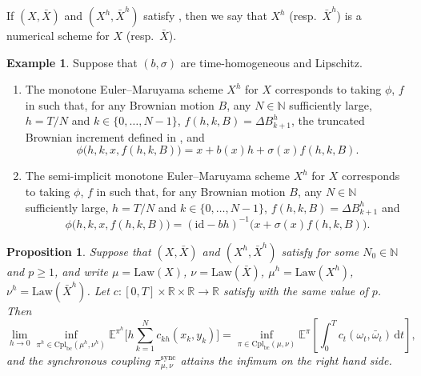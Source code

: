 \documentclass[onseside, final]{amsart}
\newtheorem{proposition}[theorem]{Proposition}
\theoremstyle{definition}
\newtheorem{example}[theorem]{Example}
\newcommand{\N}{\mathbb N}
\newcommand{\R}{\mathbb R}
\newcommand{\E}{\mathbb E}
\newcommand{\Law}{\mathrm{Law}}
\newcommand{\id}{\mathrm{id}}
\newcommand{\D}{\,\mathrm{d}}
\newcommand{\cpl}{\mathrm{Cpl}}
\newcommand{\cplba}{\cpl_{\mathrm{bc}}}
\newcommand{\sync}{\mathrm{sync}}
\numberwithin{equation}{section}
\begin{document}
	If $(X, \bar X)$ and $(X^h, \bar X^h)$ satisfy , then we say that $X^h$ (resp.~$\bar X^h$) is a numerical scheme for $X$ (resp.~$\bar X$).
	
	\begin{example}\label{ex:comon-scheme}
		Suppose that $(b, \sigma)$ are time-homogeneous and Lipschitz.
		\begin{enumerate}[label = (\roman*)]
			\item The monotone Euler--Maruyama scheme $X^h$ for $X$ corresponds to taking $\phi$, $f$ in  such that, for any Brownian motion $B$, any $N \in \N$ sufficiently large, $h = T/N$ and $k \in \{0, \dotsc, N - 1\}$, $f(h, k, B) = \Delta B^h_{k + 1}$, the truncated Brownian increment defined in , and $$\phi\bigl(h, k, x, f(h, k, B)\bigr) = x + b(x) h + \sigma(x) f(h, k, B).$$
			\item The semi-implicit monotone Euler--Maruyama scheme $X^h$ for $X$ corresponds to taking $\phi$, $f$ in  such that, for any Brownian motion $B$, any $N \in \N$ sufficiently large, $h = T/N$ and $k \in \{0, \dotsc, N - 1\}$, $f(h, k, B) = \Delta B^h_{k + 1}$ and $$\phi\bigl(h, k, x, f(h, k, B)\bigr) = (\id - b h)^{-1}\bigl(x + \sigma(x) f(h, k, B)\bigr).$$
		\end{enumerate} 
	\end{example}
	
	\begin{proposition}\label{prop:general-optimality}
		Suppose that $(X, \bar X)$ and $(X^h, \bar X^h)$ satisfy  for some $N_0 \in \N$ and $p \geq 1$, and write $\mu = \Law(X)$, $\nu = \Law(\bar X)$, $\mu^h = \Law(X^h)$, $\nu^h = \Law(\bar X^h)$. Let $c \colon [0, T] \times \R \times \R \to \R$ satisfy  with the same value of $p$. Then
		\begin{equation}\label{eq:limit-bcot}
			\lim_{h \to 0}\inf_{\pi^h \in \cplba(\mu^h, \nu^h)} \E^{\pi^h} \biggl[h\sum_{k = 1}^Nc_{kh}(x_k, y_k)\biggr] = \inf_{\pi \in \cplba(\mu, \nu)}\E^\pi\!\left[\int_0^Tc_t(\omega_t, \bar \omega_t) \D t\right]\!,
		\end{equation}
		and the synchronous coupling $\pi^\sync_{\mu, \nu}$ attains the infimum on the right hand side.
	\end{proposition}
	
\end{document}
